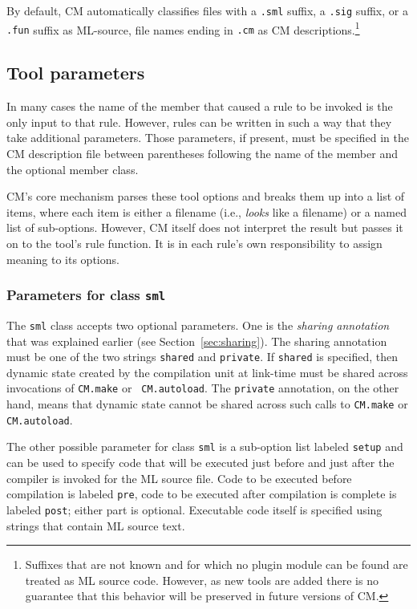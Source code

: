 \documentclass[titlepage,letterpaper]{article}
\begin{document}
By default, CM automatically classifies files with a {\tt .sml}
suffix, a {\tt .sig} suffix, or a {\tt .fun} suffix as ML-source, file
names ending in {\tt .cm} as CM descriptions.\footnote{Suffixes that
are not known and for which no plugin module can be found are treated
as ML source code.  However, as new tools are added there is no
guarantee that this behavior will be preserved in future versions of
CM.}

\subsection{Tool parameters}
\label{sec:toolparam}

In many cases the name of the member that caused a rule to be invoked
is the only input to that rule.  However, rules can be written in such
a way that they take additional parameters.  Those parameters, if
present, must be specified in the CM description file between
parentheses following the name of the member and the optional member
class.

CM's core mechanism parses these tool options and breaks them up into
a list of items, where each item is either a filename (i.e., {\em
looks} like a filename) or a named list of sub-options.  However, CM
itself does not interpret the result but passes it on to the tool's
rule function.  It is in each rule's own responsibility to assign
meaning to its options.

\subsubsection{Parameters for class {\tt sml}}

The {\tt sml} class accepts two optional parameters.  One is the {\em
sharing annotation} that was explained earlier (see
Section~\ref{sec:sharing}).  The sharing annotation must be one of the
two strings {\tt shared} and {\tt private}.  If {\tt shared} is
specified, then dynamic state created by the compilation unit at
link-time must be shared across invocations of {\tt CM.make} or {\tt
CM.autoload}.  The {\tt private} annotation, on the other hand, means
that dynamic state cannot be shared across such calls to {\tt CM.make}
or {\tt CM.autoload}.

The other possible parameter for class {\tt sml} is a sub-option
list labeled {\tt setup} and can be used to specify code that will be
executed just before and just after the compiler is invoked for the
ML source file.  Code to be executed before compilation is labeled
{\tt pre}, code to be executed after compilation is complete is
labeled {\tt post}; either part is optional.  Executable code itself
is specified using strings that contain ML source text.
\end{document}
